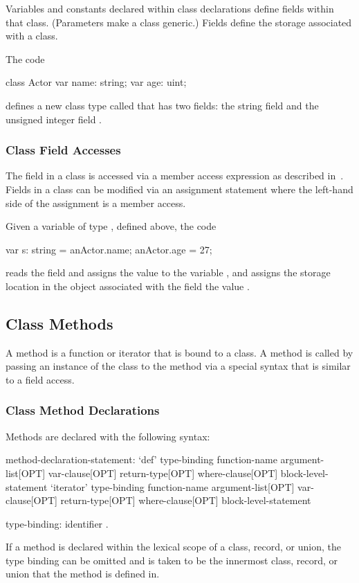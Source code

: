 Variables and constants declared within class declarations define
fields within that class.  (Parameters make a class generic.)  Fields
define the storage associated with a class.

\begin{example}
The code
\begin{chapel}
class Actor {
  var name: string;
  var age: uint;
}
\end{chapel}
defines a new class type called  that has two fields: the
string field  and the unsigned integer field .
\end{example}

\subsubsection{Class Field Accesses}
\label{Class_Field_Accesses}

The field in a class is accessed via a member access expression as
described in~.  Fields in a class can
be modified via an assignment statement where the left-hand side of
the assignment is a member access.
\begin{example}
Given a variable  of type , defined above,
the code
\begin{chapel}
var s: string = anActor.name;
anActor.age = 27;
\end{chapel}
reads the field  and assigns the value to the variable
, and assigns the storage location in the object
 associated with the field  the value
.
\end{example}

\subsection{Class Methods}
\label{Class_Methods}

A method is a function or iterator that is bound to a class.  A method
is called by passing an instance of the class to the method via a
special syntax that is similar to a field access.

\subsubsection{Class Method Declarations}
\label{Class_Method_Declarations}

Methods are declared with the following syntax:
\begin{syntax}
method-declaration-statement:
  `def' type-binding function-name argument-list[OPT] var-clause[OPT]
    return-type[OPT] where-clause[OPT] block-level-statement
  `iterator' type-binding function-name argument-list[OPT] var-clause[OPT]
    return-type[OPT] where-clause[OPT] block-level-statement

type-binding:
  identifier .
\end{syntax}
If a method is declared within the lexical scope of a class, record,
or union, the type binding can be omitted and is taken to be the
innermost class, record, or union that the method is defined in.


